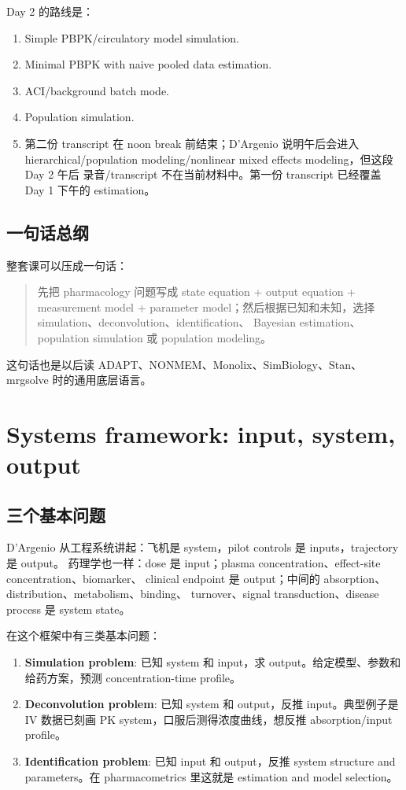 \documentclass[a4paper]{article}
\newcommand{\concept}[1]{\textbf{#1}}
\begin{document}
Day 2 的路线是：

\begin{enumerate}
  \item Simple PBPK/circulatory model simulation.
  \item Minimal PBPK with naive pooled data estimation.
  \item ACI/background batch mode.
  \item Population simulation.
  \item 第二份 transcript 在 noon break 前结束；D'Argenio 说明午后会进入
  hierarchical/population modeling/nonlinear mixed effects modeling，但这段 Day 2 午后
  录音/transcript 不在当前材料中。第一份 transcript 已经覆盖 Day 1 下午的 estimation。
\end{enumerate}

\subsection{一句话总纲}

整套课可以压成一句话：

\begin{quote}
先把 pharmacology 问题写成 state equation + output equation + measurement model +
parameter model；然后根据已知和未知，选择 simulation、deconvolution、identification、
Bayesian estimation、population simulation 或 population modeling。
\end{quote}

这句话也是以后读 ADAPT、NONMEM、Monolix、SimBiology、Stan、mrgsolve 时的通用底层语言。

\section{Systems framework: input, system, output}

\subsection{三个基本问题}

D'Argenio 从工程系统讲起：飞机是 system，pilot controls 是 inputs，trajectory 是 output。
药理学也一样：dose 是 input；plasma concentration、effect-site concentration、biomarker、
clinical endpoint 是 output；中间的 absorption、distribution、metabolism、binding、
turnover、signal transduction、disease process 是 system state。

在这个框架中有三类基本问题：

\begin{enumerate}
  \item \concept{Simulation problem}: 已知 system 和 input，求 output。给定模型、参数和给药方案，预测 concentration-time profile。
  \item \concept{Deconvolution problem}: 已知 system 和 output，反推 input。典型例子是 IV 数据已刻画 PK system，口服后测得浓度曲线，想反推 absorption/input profile。
  \item \concept{Identification problem}: 已知 input 和 output，反推 system structure and parameters。在 pharmacometrics 里这就是 estimation and model selection。
\end{enumerate}
\end{document}
